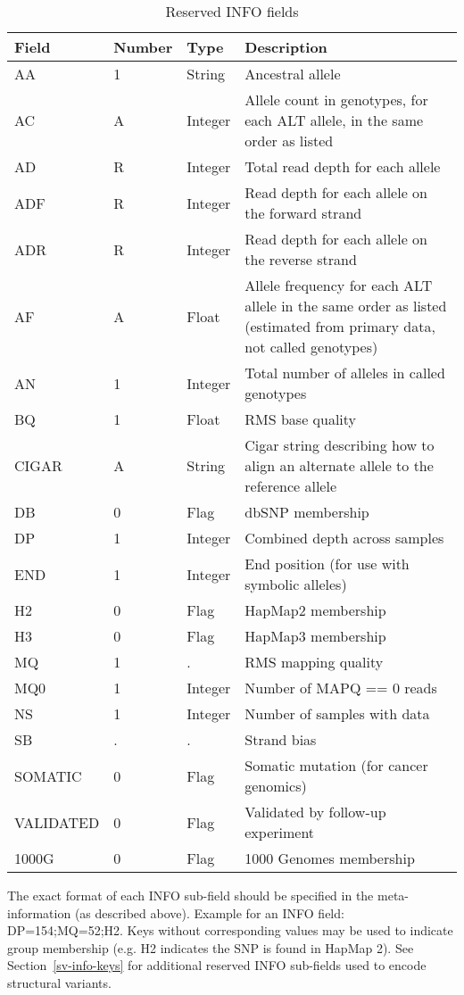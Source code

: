 \documentclass[8pt]{article}
\begin{document}
\begin{enumerate}
  \begin{table}[htbp]
    \centering
    \begin{tabularx}{\textwidth}{ | p{2.5cm} | p{1.5cm} | p{1.5cm} | X | }
	Field		& Number	& Type		& Description \\ \hline
	AA		& 1		& String	& Ancestral allele \\
	AC		& A		& Integer	& Allele count in genotypes, for each ALT allele, in the same order as listed  \\
	AD		& R		& Integer	& Total read depth for each allele \\
	ADF		& R		& Integer	& Read depth for each allele on the forward strand \\
	ADR		& R		& Integer	& Read depth for each allele on the reverse strand \\
	AF		& A		& Float		& Allele frequency for each ALT allele in the same order as listed (estimated from primary data, not called genotypes) \\
	AN		& 1		& Integer	& Total number of alleles in called genotypes \\
	BQ   		& 1		& Float		& RMS base quality \\
	CIGAR		& A		& String	& Cigar string describing how to align an alternate allele to the reference allele \\
	DB		& 0		& Flag		& dbSNP membership \\
	DP		& 1		& Integer	& Combined depth across samples \\
	END		& 1		& Integer	& End position (for use with symbolic alleles) \\
	H2		& 0		& Flag		& HapMap2 membership \\
	H3		& 0		& Flag		& HapMap3 membership \\
	MQ		& 1		& .		& RMS mapping quality \\
	MQ0   		& 1		& Integer	& Number of MAPQ == 0 reads \\
	NS		& 1		& Integer	& Number of samples with data \\
	SB		& .		& .		& Strand bias \\
	SOMATIC		& 0		& Flag		& Somatic mutation (for cancer genomics) \\
	VALIDATED	& 0		& Flag		& Validated by follow-up experiment \\
	1000G		& 0		& Flag		& 1000 Genomes membership \\
    \end{tabularx}
    \caption{Reserved INFO fields}
    \label{table:reserved-info}
  \end{table}

  The exact format of each INFO sub-field should be specified in the meta-information (as described above).
  Example for an INFO field: DP=154;MQ=52;H2. Keys without corresponding values may be used to indicate group membership (e.g. H2 indicates the SNP is found in HapMap 2). See Section~\ref{sv-info-keys} for additional reserved INFO sub-fields used to encode structural variants.
\end{enumerate}
\end{document}
